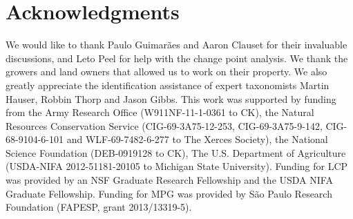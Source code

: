 \documentclass[12pt]{article}
\begin{document}




\section*{Acknowledgments}
\label{sec:acknowledge}

We would like to thank Paulo Guimar{\~a}es and Aaron Clauset for their
invaluable discussions, and Leto Peel for help with the change point
analysis.  We thank the growers and land owners that allowed us to
work on their property.  We also greatly appreciate the identification
assistance of expert taxonomists Martin Hauser, Robbin Thorp and Jason
Gibbs.  This work was supported by funding from the Army Research
Office (W911NF-11-1-0361 to CK), the Natural Resources Conservation
Service (CIG-69-3A75-12-253, CIG-69-3A75-9-142, CIG-68-9104-6-101 and
WLF-69-7482-6-277 to The Xerces Society), the National Science
Foundation (DEB-0919128 to CK), The U.S.  Department of Agriculture
(USDA-NIFA 2012-51181-20105 to Michigan State University).  Funding
for LCP was provided by an NSF Graduate Research Fellowship and the
USDA NIFA Graduate Fellowship. Funding for MPG was provided by S{\~a}o
Paulo Research Foundation (FAPESP, grant 2013/13319-5).


\end{document}
